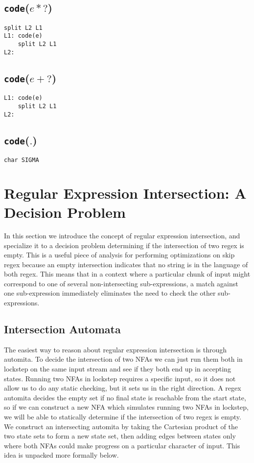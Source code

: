 \subsection{{\tt code}($e*?$)}

\begin{verbatim}
split L2 L1
L1: code(e)
    split L2 L1
L2: 
\end{verbatim}

\subsection{{\tt code}($e+?$)}

\begin{verbatim}
L1: code(e)
    split L2 L1
L2: 
\end{verbatim}

\subsection{{\tt code}($.$)}

\begin{verbatim}
char SIGMA
\end{verbatim}

\section{Regular Expression Intersection: A Decision Problem}

In this section we introduce the concept of regular expression
intersection, and specialize it to a decision problem determining
if the intersection of two regex is empty. This is a useful
piece of analysis for performing optimizations on skip regex
because an empty intersection indicates that no string is in
the language of both regex. This means that in a context where
a particular chunk of input might correspond to one of several
non-intersecting sub-expressions, a match against one sub-expression
immediately eliminates the need to check the other sub-expressions.

\subsection{Intersection Automata}

The easiest way to reason about regular expression intersection
is through automita. To decide the intersection of two NFAs we
can just run them both in lockstep on the same input stream
and see if they both end up in accepting states. Running two
NFAs in lockstep requires a specific input, so it does not allow
us to do any static checking, but it sets us in the right direction.
A regex automita decides the empty set if no final state is reachable
from the start state, so if we can construct a new NFA which simulates
running two NFAs in lockstep, we will be able to statically determine
if the intersection of two regex is empty. We construct an
intersecting automita by taking the Cartesian product
of the two state sets to form a new state set, then adding edges
between states only where both NFAs could make progress on a particular
character of input. This idea is unpacked more formally below.


